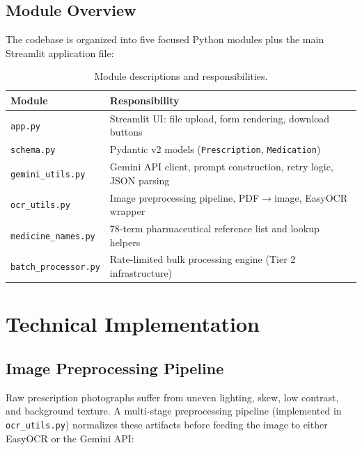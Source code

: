 \documentclass[12pt,a4paper]{article}
\begin{document}
\subsection{Module Overview}

The codebase is organized into five focused Python modules plus the main Streamlit
application file:

\begin{table}[H]
\centering
\caption{Module descriptions and responsibilities.}
\label{tab:modules}
\begin{tabular}{@{}lp{9cm}@{}}
\toprule
\textbf{Module} & \textbf{Responsibility} \\
\midrule
\texttt{app.py}           & Streamlit UI: file upload, form rendering, download buttons \\
\texttt{schema.py}        & Pydantic v2 models (\texttt{Prescription}, \texttt{Medication}) \\
\texttt{gemini\_utils.py} & Gemini API client, prompt construction, retry logic, JSON parsing \\
\texttt{ocr\_utils.py}    & Image preprocessing pipeline, PDF$\to$image, EasyOCR wrapper \\
\texttt{medicine\_names.py} & 78-term pharmaceutical reference list and lookup helpers \\
\texttt{batch\_processor.py} & Rate-limited bulk processing engine (Tier 2 infrastructure) \\
\bottomrule
\end{tabular}
\end{table}

\section{Technical Implementation}

\subsection{Image Preprocessing Pipeline}

Raw prescription photographs suffer from uneven lighting, skew, low contrast, and
background texture. A multi-stage preprocessing pipeline (implemented in
\texttt{ocr\_utils.py}) normalizes these artifacts before feeding the image to
either EasyOCR or the Gemini API:
\end{document}
